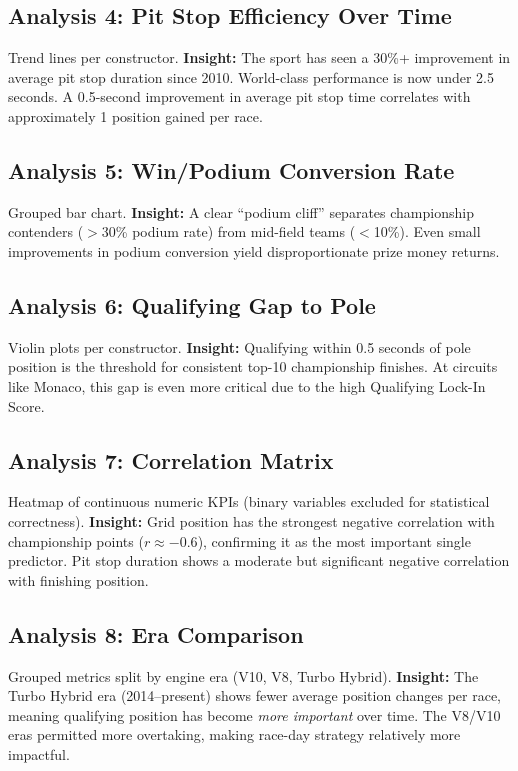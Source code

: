 \documentclass[12pt, a4paper]{article}
\begin{document}
\subsection{Analysis 4: Pit Stop Efficiency Over Time}
Trend lines per constructor. \textbf{Insight:} The sport has seen a 30\%+ improvement in average pit stop duration since 2010. World-class performance is now under 2.5 seconds. A 0.5-second improvement in average pit stop time correlates with approximately 1 position gained per race.

\subsection{Analysis 5: Win/Podium Conversion Rate}
Grouped bar chart. \textbf{Insight:} A clear ``podium cliff'' separates championship contenders ($>$30\% podium rate) from mid-field teams ($<$10\%). Even small improvements in podium conversion yield disproportionate prize money returns.

\subsection{Analysis 6: Qualifying Gap to Pole}
Violin plots per constructor. \textbf{Insight:} Qualifying within 0.5 seconds of pole position is the threshold for consistent top-10 championship finishes. At circuits like Monaco, this gap is even more critical due to the high Qualifying Lock-In Score.

\subsection{Analysis 7: Correlation Matrix}
Heatmap of continuous numeric KPIs (binary variables excluded for statistical correctness). \textbf{Insight:} Grid position has the strongest negative correlation with championship points ($r \approx -0.6$), confirming it as the most important single predictor. Pit stop duration shows a moderate but significant negative correlation with finishing position.

\subsection{Analysis 8: Era Comparison}
Grouped metrics split by engine era (V10, V8, Turbo Hybrid). \textbf{Insight:} The Turbo Hybrid era (2014--present) shows fewer average position changes per race, meaning qualifying position has become \textit{more important} over time. The V8/V10 eras permitted more overtaking, making race-day strategy relatively more impactful.
\end{document}
